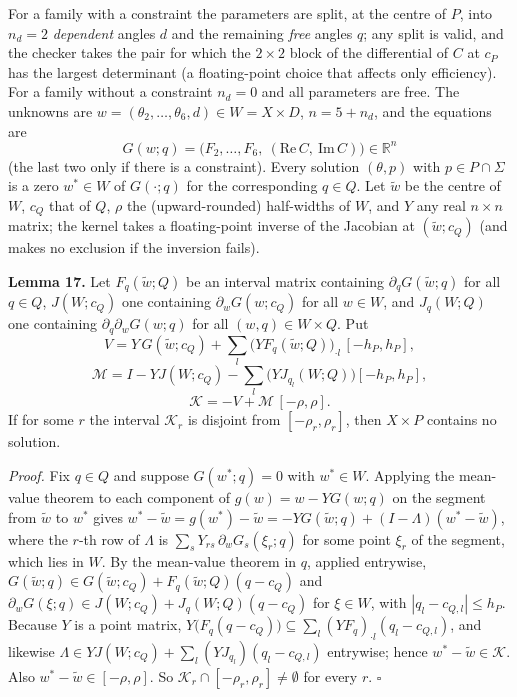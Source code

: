 \documentclass[
  11pt,
]{article}
\begin{document}
For a family with a constraint the parameters are split, at the centre
of \(P\), into \(n_d=2\) \emph{dependent} angles \(d\) and the remaining
\emph{free} angles \(q\); any split is valid, and the checker takes the
pair for which the \(2\times2\) block of the differential of \(C\) at
\(c_P\) has the largest determinant (a floating-point choice that
affects only efficiency). For a family without a constraint \(n_d=0\)
and all parameters are free. The unknowns are
\(w=(\theta_2,\dots,\theta_6,d)\in W=X\times D\), \(n=5+n_d\), and the
equations are \[
G(w;q)=\big(F_2,\dots,F_6,\ (\mathrm{Re}\,C,\ \mathrm{Im}\,C)\big)\in\mathbb R^{n}
\] (the last two only if there is a constraint). Every solution
\((\theta,p)\) with \(p\in P\cap\Sigma\) is a zero \(w^*\in W\) of
\(G(\cdot;q)\) for the corresponding \(q\in Q\). Let \(\tilde w\) be the
centre of \(W\), \(c_Q\) that of \(Q\), \(\rho\) the (upward-rounded)
half-widths of \(W\), and \(Y\) any real \(n\times n\) matrix; the
kernel takes a floating-point inverse of the Jacobian at
\((\tilde w;c_Q)\) (and makes no exclusion if the inversion fails).

\textbf{Lemma 17.} Let \(F_q(\tilde w;Q)\) be an interval matrix
containing \(\partial_qG(\tilde w;q)\) for all \(q\in Q\), \(J(W;c_Q)\)
one containing \(\partial_wG(w;c_Q)\) for all \(w\in W\), and
\(J_q(W;Q)\) one containing \(\partial_q\partial_wG(w;q)\) for all
\((w,q)\in W\times Q\). Put \[
V=Y\,G(\tilde w;c_Q)+\sum_l\big(Y F_q(\tilde w;Q)\big)_{\cdot l}\,[-h_P,h_P],
\] \[
\mathcal M=I-Y J(W;c_Q)-\sum_l\big(YJ_{q_l}(W;Q)\big)[-h_P,h_P],
\] \[
\mathcal K=-V+\mathcal M\,[-\rho,\rho].
\] If for some \(r\) the interval \(\mathcal K_r\) is disjoint from
\([-\rho_r,\rho_r]\), then \(X\times P\) contains no solution.

\emph{Proof.} Fix \(q\in Q\) and suppose \(G(w^*;q)=0\) with
\(w^*\in W\). Applying the mean-value theorem to each component of
\(g(w)=w-YG(w;q)\) on the segment from \(\tilde w\) to \(w^*\) gives
\(w^*-\tilde w=g(w^*)-\tilde w=-YG(\tilde w;q)+(I-\Lambda)(w^*-\tilde w)\),
where the \(r\)-th row of \(\Lambda\) is
\(\sum_sY_{rs}\,\partial_wG_s(\xi_r;q)\) for some point \(\xi_r\) of the
segment, which lies in \(W\). By the mean-value theorem in \(q\),
applied entrywise,
\(G(\tilde w;q)\in G(\tilde w;c_Q)+F_q(\tilde w;Q)(q-c_Q)\) and
\(\partial_wG(\xi;q)\in J(W;c_Q)+J_q(W;Q)(q-c_Q)\) for \(\xi\in W\),
with \(|q_l-c_{Q,l}|\le h_P\). Because \(Y\) is a point matrix,
\(Y\big(F_q(q-c_Q)\big)\subseteq\sum_l(YF_q)_{\cdot l}(q_l-c_{Q,l})\),
and likewise \(\Lambda\in YJ(W;c_Q)+\sum_l(YJ_{q_l})(q_l-c_{Q,l})\)
entrywise; hence \(w^*-\tilde w\in\mathcal K\). Also
\(w^*-\tilde w\in[-\rho,\rho]\). So
\(\mathcal K_r\cap[-\rho_r,\rho_r]\ne\emptyset\) for every \(r\).
\(\square\)
\end{document}

